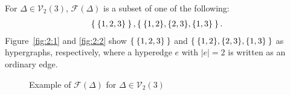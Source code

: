 \documentclass{wstmp}
\begin{document}
\begin{example}
For $\Delta \in {\mathcal{V}}_2(3)$,
${\mathcal{F}}(\Delta)$
is a subset of one of the following:
\begin{align*}
\Set{\{1,2,3\}}, \Set{\{1,2\},\{2,3\},\{1,3\}}.
\end{align*}
Figure~\ref{fig:2:1} and \ref{fig:2:2}
show $\Set{\{1,2,3\}}$ and $\Set{\{1,2\},\{2,3\},\{1,3\}}$
as hypergraphs, respectively, where a hyperedge $e$ with ${\left|{e}\right|}=2$ is
written as an ordinary edge.
\begin{figure}[t]
\hfil
{}
\hfil
{}
\caption{Example of ${\mathcal{F}}(\Delta)$ for $\Delta\in {\mathcal{V}}_2(3)$}
\label{fig:exampleFDelta:3}
\end{figure}
\end{example}
\end{document}
